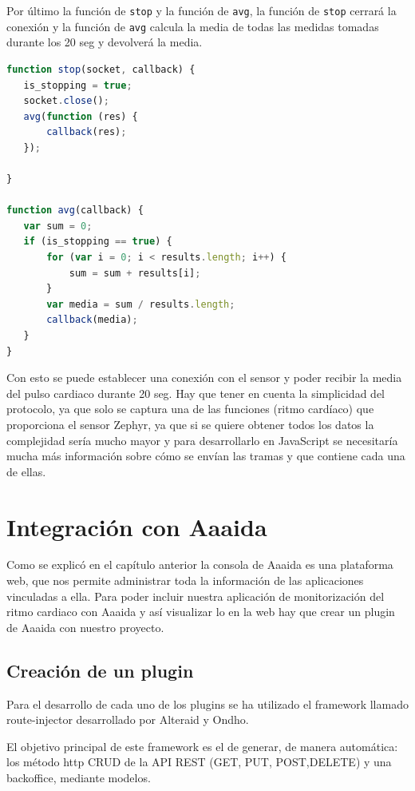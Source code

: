 Por último la función de \texttt{stop} y la función de \texttt{avg}, la función de \texttt{stop} cerrará la conexión y la función de \texttt{avg} calcula la media de todas las medidas tomadas durante los 20 seg y devolverá la media. 

\begin{lstlisting}[language=JavaScript]
function stop(socket, callback) {
   is_stopping = true;
   socket.close();
   avg(function (res) {
       callback(res);
   });

}

function avg(callback) {
   var sum = 0;
   if (is_stopping == true) {
       for (var i = 0; i < results.length; i++) {
           sum = sum + results[i];
       }
       var media = sum / results.length;
       callback(media);
   }
}
\end{lstlisting}

Con esto se puede establecer una conexión con el sensor y poder recibir la media del pulso cardiaco durante 20 seg. Hay que tener en cuenta la simplicidad del protocolo, ya que solo se captura una de las funciones (ritmo cardíaco) que proporciona el sensor Zephyr, ya que si se quiere obtener todos los datos la complejidad sería mucho mayor y para desarrollarlo en JavaScript se necesitaría mucha más información sobre cómo se envían las tramas y que contiene cada una de ellas.
\pagebreak
\section{Integración con Aaaida}

Como se explicó en el capítulo anterior la consola de Aaaida es una plataforma web, que nos permite administrar toda la información de las aplicaciones vinculadas a ella. 
Para poder incluir nuestra aplicación de monitorización del ritmo cardiaco con Aaaida y así visualizar lo en la web hay que crear un plugin de Aaaida con nuestro proyecto. 

\subsection{Creación de un plugin}

Para el desarrollo de cada uno de los plugins se ha utilizado el framework llamado route-injector desarrollado por Alteraid y Ondho. 

El objetivo principal de este framework es el de generar, de manera automática:
los método http CRUD de la API REST (GET, PUT, POST,DELETE) y una
backoffice, mediante modelos.

